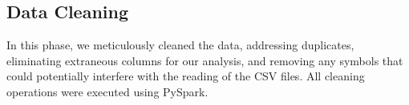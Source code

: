 \subsection*{Data Cleaning}
In this phase, we meticulously cleaned the data, addressing duplicates, eliminating extraneous columns for our analysis, and removing any symbols that could potentially interfere with the reading of the CSV files. All cleaning operations were executed using PySpark.

